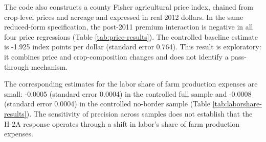 \documentclass[14pt]{article}
\begin{document}
The code also constructs a county Fisher agricultural price index, chained
from crop-level prices and acreage and expressed in real 2012 dollars.  In the
same reduced-form specification, the post-2011 premium interaction is negative
in all four price regressions (Table \ref{tab:price-results}).  The controlled
baseline estimate is -1.925 index points per dollar (standard error 0.764).
This result is exploratory: it combines price and crop-composition changes and
does not identify a pass-through mechanism.

The corresponding estimates for the labor share of farm production expenses
are small: -0.0005 (standard error 0.0004) in the controlled full sample and
-0.0008 (standard error 0.0004) in the controlled no-border sample (Table
\ref{tab:laborshare-results}).  The sensitivity of precision across samples
does not establish that the H-2A response operates through a shift in labor's
share of farm production expenses.

\begin{table}[ht]
	\centering
	\small
	
	\caption{Exploratory reduced-form estimates for the county Fisher agricultural price index.}
	\label{tab:price-results}
\end{table}

\begin{table}[ht]
	\centering
	\small
	
	\caption{Exploratory reduced-form estimates for labor's share of farm production expenses.}
	\label{tab:laborshare-results}
\end{table}
\end{document}
